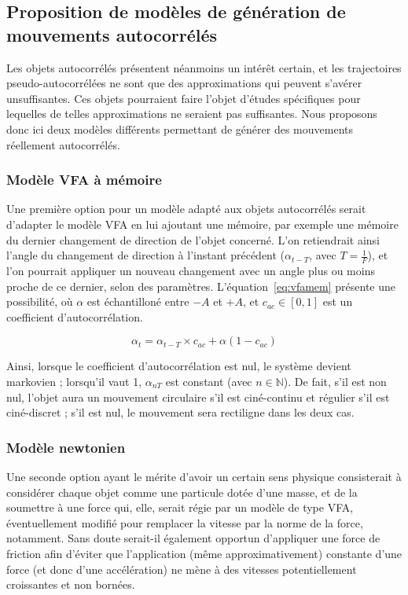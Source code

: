     \subsection{Proposition de modèles de génération de mouvements autocorrélés}
    Les objets autocorrélés présentent néanmoins un intérêt certain, et les trajectoires pseudo-autocorrélées ne sont que des approximations qui peuvent s'avérer unsuffisantes. Ces objets pourraient faire l'objet d'études spécifiques pour lequelles de telles approximations ne seraient pas suffisantes. Nous proposons donc ici deux modèles différents permettant de générer des mouvements réellement autocorrélés.
    
    \subsubsection{Modèle VFA à mémoire}
    Une première option pour un modèle adapté aux objets autocorrélés serait d'adapter le modèle VFA en lui ajoutant une mémoire, par exemple une mémoire du dernier changement de direction de l'objet concerné. L'on retiendrait ainsi l'angle du changement de direction à l'instant précédent ($\alpha_{t-T}$, avec $T = \frac{1}{F}$), et l'on pourrait appliquer un nouveau changement avec un angle plus ou moins proche de ce dernier, selon des paramètres. L'équation~\ref{eq:vfamem} présente une possibilité, où $\alpha$ est échantilloné entre $-A$ et $+A$, et $c_{ac} \in [0,1]$ est un coefficient d'autocorrélation.
    
    \begin{equation}
		\alpha_{t} = \alpha_{t-T} \times c_{ac} + \alpha (1 - c_{ac})
		\label{eq:vfamem}
    \end{equation}
    
	Ainsi, lorsque le coefficient d'autocorrélation est nul, le système devient markovien ; lorsqu'il vaut 1, $\alpha_{nT}$ est constant (avec $n \in \mathbb{N}$). De fait, s'il est non nul, l'objet aura un mouvement circulaire s'il est ciné-continu et régulier s'il est ciné-discret ; s'il est nul, le mouvement sera rectiligne dans les deux cas.
    
    \subsubsection{Modèle newtonien}
    Une seconde option ayant le mérite d'avoir un certain sens physique consisterait à considérer chaque objet comme une particule dotée d'une masse, et de la soumettre à une force qui, elle, serait régie par un modèle de type VFA, éventuellement modifié pour remplacer la vitesse par la norme de la force, notamment. Sans doute serait-il également opportun d'appliquer une force de friction afin d'éviter que l'application (même approximativement) constante d'une force (et donc d'une accélération\footnotemark{}) ne mène à des vitesses potentiellement croissantes et non bornées.
    
